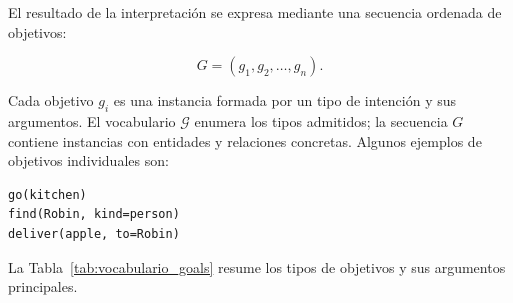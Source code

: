 El resultado de la interpretación se expresa mediante una secuencia ordenada de
objetivos:

\[
G=(g_1,g_2,\ldots,g_n).
\]

Cada objetivo $g_i$ es una instancia formada por un tipo de intención y sus argumentos. El vocabulario $\mathcal{G}$ enumera los tipos admitidos; la secuencia $G$ contiene instancias con entidades y relaciones concretas. Algunos ejemplos de objetivos individuales son:

\begin{verbatim}
go(kitchen)
find(Robin, kind=person)
deliver(apple, to=Robin)
\end{verbatim}

La Tabla~\ref{tab:vocabulario_goals} resume los tipos de objetivos y sus argumentos principales.

